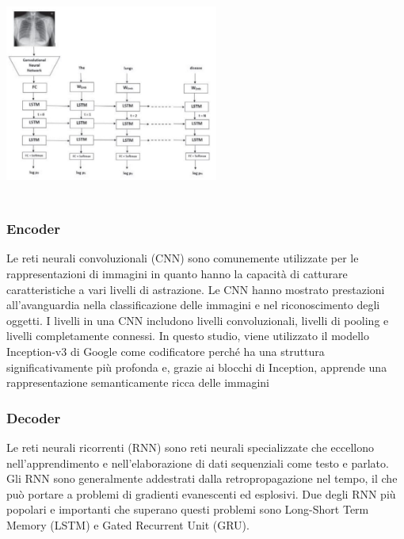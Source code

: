 \documentclass[12pt,a4paper]{report}
\begin{document}
\begin{center}
\includegraphics[width=7cm,height=7cm,keepaspectratio]{LSTM}
\end{center}

\subsubsection{Encoder}
Le reti neurali convoluzionali (CNN) sono comunemente utilizzate per le rappresentazioni di immagini in quanto hanno la capacità di catturare caratteristiche a vari livelli di astrazione. Le CNN hanno mostrato prestazioni all'avanguardia nella classificazione delle immagini e nel riconoscimento degli oggetti. I livelli in una CNN includono livelli convoluzionali, livelli di pooling e livelli completamente connessi. 
In questo studio, viene utilizzato il modello Inception-v3 di Google come codificatore perché ha una struttura significativamente più profonda e, grazie ai blocchi di Inception, apprende una rappresentazione semanticamente ricca delle immagini

\subsubsection{Decoder}
Le reti neurali ricorrenti (RNN) sono reti neurali specializzate che eccellono nell'apprendimento e nell'elaborazione di dati sequenziali come testo e parlato. Gli RNN sono generalmente addestrati dalla retropropagazione nel tempo, il che può portare a problemi di gradienti evanescenti ed esplosivi. Due degli RNN più popolari e importanti che superano questi problemi sono Long-Short Term Memory (LSTM) e Gated Recurrent Unit (GRU).
\end{document}
